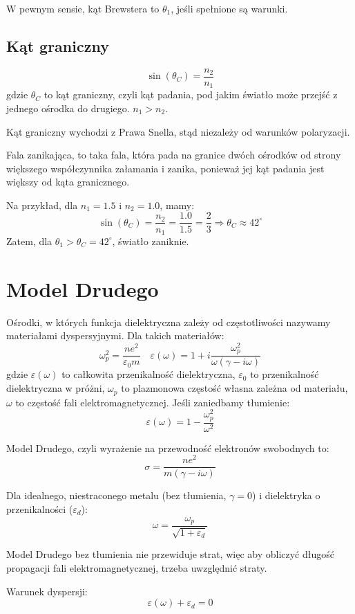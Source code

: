 \documentclass{../notatki}
\begin{document}
W pewnym sensie, kąt Brewstera to $\theta_1$, jeśli spełnione są warunki.

\subsection{Kąt graniczny}

$$
\sin(\theta_C) = \frac{n_2}{n_1}
$$
gdzie $\theta_C$ to kąt graniczny, czyli kąt padania, pod jakim światło może
przejść z jednego ośrodka do drugiego. $n_1 > n_2$.

Kąt graniczny wychodzi z Prawa Snella, stąd niezależy od warunków polaryzacji.

Fala zanikająca, to taka fala, która pada na granice dwóch ośrodków
od strony większego współczynnika załamania i zanika,
ponieważ jej kąt padania jest większy od kąta granicznego.

\begin{examplebox}
  Na przykład, dla $n_1 = 1.5$ i $n_2 = 1.0$, mamy:
  $$
  \sin(\theta_C) = \frac{n_2}{n_1} = \frac{1.0}{1.5} = \frac{2}{3}
  \Rightarrow \theta_C \approx 42^\circ
  $$
  Zatem, dla $\theta_1 > \theta_C = 42^\circ$, światło zaniknie.
\end{examplebox}

\section{Model Drudego}

Ośrodki, w których funkcja dielektryczna zależy od częstotliwości nazywamy
materiałami dyspersyjnymi. Dla takich materiałów:
$$
\omega_p^2 = \frac{ne^2}{\varepsilon_0m} \quad \varepsilon(\omega) =
1 + i\frac{\omega_p^2}{\omega(\gamma - i\omega)}
$$
gdzie $\varepsilon(\omega)$ to całkowita przenikalność dielektryczna,
$\varepsilon_0$ to przenikalność dielektryczna w próżni,
$\omega_p$ to plazmonowa częstość własna zależna od materiału,
$\omega$ to częstość fali elektromagnetycznej. Jeśli zaniedbamy tłumienie:
$$
\varepsilon(\omega) = 1 - \frac{\omega_p^2}{\omega^2}
$$

Model Drudego, czyli wyrażenie na przewodność elektronów swobodnych to:
$$
\sigma = \frac{ne^2}{m(\gamma - i\omega)}
$$

Dla idealnego, niestraconego metalu (bez tłumienia, $\gamma=0$) i
dielektryka o przenikalności ($\varepsilon_d$):
$$
\omega = \frac{\omega_p}{\sqrt{1 + \varepsilon_d}}
$$

Model Drudego bez tłumienia nie przewiduje strat, więc aby obliczyć długość
propagacji fali elektromagnetycznej, trzeba uwzględnić straty.

Warunek dyspersji:
$$
\varepsilon(\omega) + \varepsilon_d = 0
$$
\end{document}
